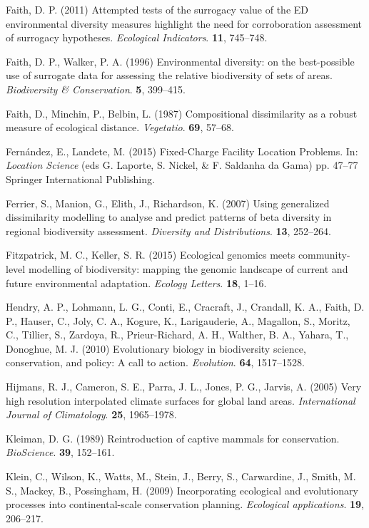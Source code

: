 \documentclass[11pt,]{article}
\begin{document}
Faith, D. P. (2011) Attempted tests of the surrogacy value of the ED
environmental diversity measures highlight the need for corroboration
assessment of surrogacy hypotheses. \emph{Ecological Indicators}.
\textbf{11}, 745--748.

Faith, D. P., Walker, P. A. (1996) Environmental diversity: on the
best-possible use of surrogate data for assessing the relative
biodiversity of sets of areas. \emph{Biodiversity \& Conservation}.
\textbf{5}, 399--415.

Faith, D., Minchin, P., Belbin, L. (1987) Compositional dissimilarity as
a robust measure of ecological distance. \emph{Vegetatio}. \textbf{69},
57--68.

Fernández, E., Landete, M. (2015) Fixed-Charge Facility Location
Problems. In: \emph{Location Science} (eds G. Laporte, S. Nickel, \& F.
Saldanha da Gama) pp. 47--77 Springer International Publishing.

Ferrier, S., Manion, G., Elith, J., Richardson, K. (2007) Using
generalized dissimilarity modelling to analyse and predict patterns of
beta diversity in regional biodiversity assessment. \emph{Diversity and
Distributions}. \textbf{13}, 252--264.

Fitzpatrick, M. C., Keller, S. R. (2015) Ecological genomics meets
community-level modelling of biodiversity: mapping the genomic landscape
of current and future environmental adaptation. \emph{Ecology Letters}.
\textbf{18}, 1--16.

Hendry, A. P., Lohmann, L. G., Conti, E., Cracraft, J., Crandall, K. A.,
Faith, D. P., Hauser, C., Joly, C. A., Kogure, K., Larigauderie, A.,
Magallon, S., Moritz, C., Tillier, S., Zardoya, R., Prieur-Richard, A.
H., Walther, B. A., Yahara, T., Donoghue, M. J. (2010) Evolutionary
biology in biodiversity science, conservation, and policy: A call to
action. \emph{Evolution}. \textbf{64}, 1517--1528.

Hijmans, R. J., Cameron, S. E., Parra, J. L., Jones, P. G., Jarvis, A.
(2005) Very high resolution interpolated climate surfaces for global
land areas. \emph{International Journal of Climatology}. \textbf{25},
1965--1978.

Kleiman, D. G. (1989) Reintroduction of captive mammals for
conservation. \emph{BioScience}. \textbf{39}, 152--161.

Klein, C., Wilson, K., Watts, M., Stein, J., Berry, S., Carwardine, J.,
Smith, M. S., Mackey, B., Possingham, H. (2009) Incorporating ecological
and evolutionary processes into continental-scale conservation planning.
\emph{Ecological applications}. \textbf{19}, 206--217.
\end{document}
